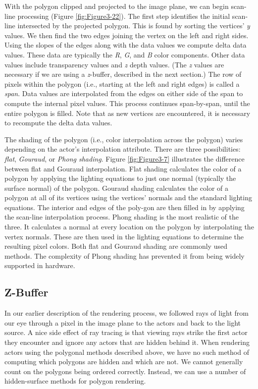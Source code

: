 With the polygon clipped and projected to the image plane, we can begin scan-line processing (Figure \ref{fig:Figure3-22}). The first step identifies the initial scan-line intersected by the projected polygon. This is found by sorting the vertices' \emph{y} values. We then find the two edges joining the vertex on the left and right sides. Using the slopes of the edges along with the data values we compute delta data values. These data are typically the \emph{R}, \emph{G}, and \emph{B} color components. Other data values include transparency values and \emph{z} depth values. (The \emph{z} values are necessary if we are using a \emph{z}-buffer, described in the next section.) The row of pixels within the polygon (i.e., starting at the left and right edges) is called a \emph{span}. Data values are interpolated from the edges on either side of the span to compute the internal pixel values. This process continues span-by-span, until the entire polygon is filled. Note that as new vertices are encountered, it is necessary to recompute the delta data values.

The shading of the polygon (i.e., color interpolation across the polygon) varies depending on the actor's interpolation attribute. \label{subsection:rasterization.phong}
There are three possibilities: \emph{flat}, \emph{Gouraud}, or \emph{Phong shading}. Figure \ref{fig:Figure3-7} illustrates the difference between flat and Gouraud interpolation. Flat shading calculates the color of a polygon by applying the lighting equations to just one normal (typically the surface normal) of the polygon. Gouraud shading calculates the color of a polygon at all of its vertices using the vertices' normals and the standard lighting equations. The interior and edges of the poly-gon are then filled in by applying the scan-line interpolation process. Phong shading is the most realistic of the three. It calculates a normal at every location on the polygon by interpolating the vertex normals. These are then used in the lighting equations to determine the resulting pixel colors. Both flat and Gouraud shading are commonly used methods. The complexity of Phong shading has prevented it from being widely supported in hardware.

\subsection{Z-Buffer}
\label{Z-Buffer}

In our earlier description of the rendering process, we followed rays of light from our eye through a pixel in the image plane to the actors and back to the light source. A nice side effect of ray tracing is that viewing rays strike the first actor they encounter and ignore any actors that are hidden behind it. When rendering actors using the polygonal methods described above, we have no such method of computing which polygons are hidden and which are not. We cannot generally count on the polygons being ordered correctly. Instead, we can use a number of hidden-surface methods for polygon rendering.

